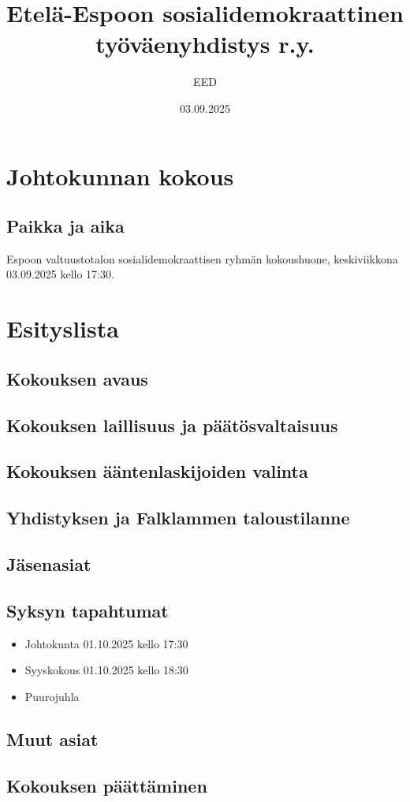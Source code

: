 \documentclass[a4paper,12pt]{article}
\title{Etelä-Espoon sosialidemokraattinen työväenyhdistys r.y.}
\author{EED}
\date{03.09.2025}
\begin{document}
\maketitle
\tableofcontents
\section*{Johtokunnan kokous}
\subsection*{Paikka ja aika}
Espoon valtuustotalon sosialidemokraattisen ryhmän kokoushuone, keskiviikkona 03.09.2025 kello 17:30.
\section*{Esityslista}
\subsection{Kokouksen avaus}
\subsection{Kokouksen laillisuus ja päätösvaltaisuus}
\subsection{Kokouksen ääntenlaskijoiden valinta}
\subsection{Yhdistyksen ja Falklammen taloustilanne}
\subsection{Jäsenasiat}
\subsection{Syksyn tapahtumat}
\begin{itemize}
\item{Johtokunta 01.10.2025 kello 17:30}
\item{Syyskokous 01.10.2025 kello 18:30}
\item{Puurojuhla}
\end{itemize}
\subsection{Muut asiat}
\subsection{Kokouksen päättäminen}
\end{document}
